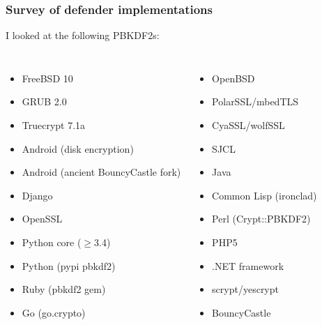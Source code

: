 \documentclass{beamer}
\begin{document}
\frame
{
  \frametitle{Survey of defender implementations}

  I looked at the following PBKDF2s:

  \begin{columns}[T]
    \begin{itemize}
      \item FreeBSD 10
      \item GRUB 2.0
      \item Truecrypt 7.1a
      \item Android (disk encryption)
      \item Android (ancient BouncyCastle fork)
      \item Django
      \item OpenSSL
      \item Python core ($\ge$3.4)
      \item Python (pypi pbkdf2)
      \item Ruby (pbkdf2 gem)
      \item Go (go.crypto)
    \end{itemize}
    \begin{itemize}
      \item OpenBSD
      \item PolarSSL/mbedTLS
      \item CyaSSL/wolfSSL
      \item SJCL
      \item Java
      \item Common Lisp (ironclad)
      \item Perl (Crypt::PBKDF2)
      \item PHP5
      \item .NET framework
      \item scrypt/yescrypt\footnotemark
      \item BouncyCastle
    \end{itemize}
  \end{columns}
  
}
\end{document}
